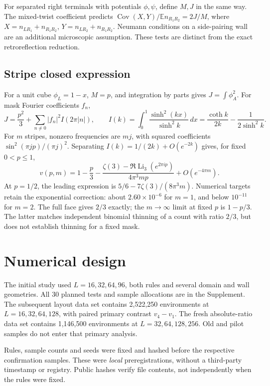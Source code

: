\documentclass[11pt,a4paper]{article}
\newcommand{\E}{\mathbb E}
\newcommand{\Cov}{\operatorname{Cov}}
\newcommand{\Li}{\operatorname{Li}}
\begin{document}
For separated right terminals with potentials \(\phi,\psi\), define \(M,J\)
in the same way. The mixed-twist coefficient predicts
\(\Cov(X,Y)/\E n_{R_1R_2}=2J/M\), where
\(X=n_{LR_1}+n_{R_1R_2}\), \(Y=n_{LR_2}+n_{R_1R_2}\).
Neumann conditions on a side-pairing wall are an additional microscopic
assumption. These tests are distinct from the exact retroreflection reduction.

\subsection{Stripe closed expression}
For a unit cube \(\phi_L=1-x\), \(M=p\), and integration by parts gives
\(J=\int\phi_A^2\). For mask Fourier coefficients \(f_n\),
\begin{equation}
J=\frac{p^2}{3}+\sum_{n\ne0}|f_n|^2I(2\pi|n|),\qquad
I(k)=\int_0^1\frac{\sinh^2(kx)}{\sinh^2k}\,dx
=\frac{\coth k}{2k}-\frac1{2\sinh^2k}.
\label{eq:fourier}
\end{equation}
For \(m\) stripes, nonzero frequencies are \(mj\), with squared coefficients
\(\sin^2(\pi jp)/(\pi j)^2\). Separating \(I(k)=1/(2k)+O(e^{-2k})\) gives,
for fixed \(0<p\leq1\),
\begin{equation}
v(p,m)=1-\frac p3-
\frac{\zeta(3)-\Re\Li_3(e^{2\pi ip})}{4\pi^3mp}+O(e^{-4\pi m}).
\label{eq:closed}
\end{equation}
At \(p=1/2\), the leading expression is
\(5/6-7\zeta(3)/(8\pi^3m)\). Numerical targets retain the exponential
correction: about \(2.60\times10^{-6}\) for \(m=1\), and below \(10^{-11}\)
for \(m=2\). The full face gives \(2/3\) exactly; the \(m\to\infty\) limit
at fixed \(p\) is \(1-p/3\). The latter matches independent binomial thinning
of a count with ratio \(2/3\), but does not establish thinning for a fixed mask.

\section{Numerical design}
The initial study used \(L=16,32,64,96\), both rules and several domain and
wall geometries. All 30 planned tests and sample allocations are in the
Supplement. The subsequent layout data set contains 2,522,250 environments
at \(L=16,32,64,128\), with paired primary contrast \(v_4-v_1\).
The fresh absolute-ratio data set contains 1,146,500 environments at
\(L=32,64,128,256\). Old and pilot samples do not enter that primary analysis.

Rules, sample counts and seeds were fixed and hashed before the respective
confirmation samples. These were \emph{local} preregistrations, without a
third-party timestamp or registry. Public hashes verify file contents,
not independently when the rules were fixed.
\end{document}
